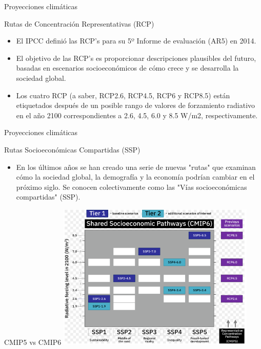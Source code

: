 \documentclass{beamer}
\begin{document}
\begin{frame} {Proyecciones climáticas}

\begin{block}{Rutas de Concentración Representativas (RCP)}
\begin{itemize}
	\setlength\itemsep{1em} 
	
	\item El IPCC definió las RCP's para su 5º Informe de evaluación (AR5) en 2014. 

	\item El objetivo de las RCP's es proporcionar descripciones plausibles del futuro, basadas en escenarios socioeconómicos de cómo crece y se desarrolla la sociedad global. 

	\item Los cuatro RCP (a saber, RCP2.6, RCP4.5, RCP6 y RCP8.5) están etiquetados después de un posible rango de valores de forzamiento radiativo en el año 2100 correspondientes a 2.6, 4.5, 6.0 y 8.5 W/m2, respectivamente.
	\end{itemize}	
\end{block}	
\end{frame}	

\begin{frame} {Proyecciones climáticas}

\begin{block}{Rutas Socioeconómicas Compartidas (SSP)}
\begin{itemize}
	\setlength\itemsep{1em} 
	
	\item En los últimos años se han creado una serie de nuevas "rutas" que examinan cómo la sociedad global, la demografía y la economía podrían cambiar en el próximo siglo. Se conocen colectivamente como las "Vías socioeconómicas compartidas" (SSP).


	\end{itemize}	
\end{block}	
\end{frame}	

\begin{frame}{CMIP5 vs CMIP6}
\includegraphics[height=7cm]{img/cmip5y6.png}
\centering
\end{frame}	
	
\end{document}
